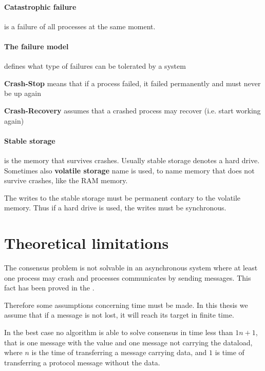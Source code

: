 \paragraph{Catastrophic failure} is a failure of all processes at the same moment.

\paragraph{The failure model}
defines what type of failures can be tolerated by a system
\begin{tightList}[ \setlength{\leftmargin}{2\leftmargin}]
 \item[\textbf{Crash-Stop}] means that if a process failed, it failed permanently and must never be up again
 \item[\textbf{Crash-Recovery}] assumes that a crashed process may recover (i.e. start working again)
\end{tightList}

\paragraph{Stable storage}
is the memory that survives crashes. Usually stable storage denotes a hard drive.
Sometimes also \textbf{volatile storage} name is used, to name memory that does not survive crashes, like the RAM memory.

\noindent The writes to the stable storage must be permanent contary to the volatile memory. Thus if a hard drive is used, the writes must be synchronous.

\section{Theoretical limitations}


The consensus problem is not solvable in an asynchronous system where at least one process may crash and processes communicates by sending messages. This fact has been proved in the \cite{FLP}.

Therefore some assumptions concerning time must be made. In this thesis we assume that if a message is not lost, it will reach its target in finite time.


In the best case no algorithm is able to solve consensus in time less than $1n+1$, that is one message with the value and one message not carrying the dataload, where $n$ is the time of transferring a message carrying data, and $1$ is time of transferring a protocol message without the data.


